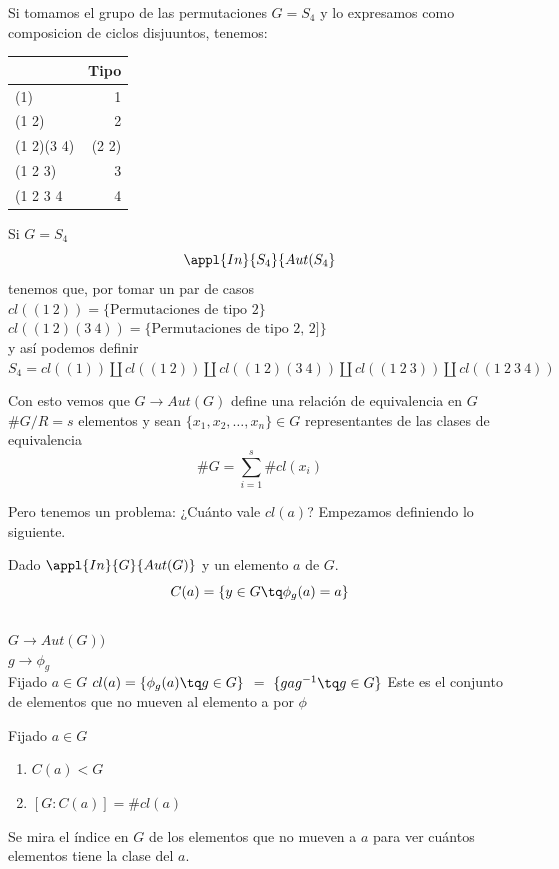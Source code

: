\documentclass{apuntes}
\begin{document}
\begin{example}
Si tomamos el grupo de las permutaciones $G=S_4$ y lo expresamos como composicion de ciclos disjuuntos, tenemos:\\
\begin{center}
\begin{tabular}{|l|r|}
\hline
& Tipo\\ 
\hline
(1) & 1\\
(1 2) & 2\\
(1 2)(3 4) & (2 2)\\
(1 2 3) & 3\\
(1 2 3 4 & 4\\
\hline
\end{tabular}
\end{center}
Si $G=S_4$\\
$$\appl{In}{S_4}{Aut(S_4}$$
tenemos que, por tomar un par de casos
$cl((1\ 2)) = \{ \text{Permutaciones de tipo 2} \}$\\
$cl((1\ 2)(3\ 4)) = \{ \text{Permutaciones de tipo 2, 2]} \}$\\
y así podemos definir\\
$S_4 = cl((1)) \coprod cl((1\ 2)) \coprod cl((1\ 2)(3\ 4)) \coprod cl((1\ 2\ 3)) \coprod cl((1\ 2\ 3\ 4))$
\end{example}

Con esto vemos que $G\longrightarrow Aut(G)$ define una relación de equivalencia en $G$\\
$\# G/R = s$ elementos y sean $\{ x_1, x_2, \hdots, x_n\} \in G$ representantes de las clases de equivalencia\\
$$\# G = \sum_{i=1}^s \# cl(x_i)$$

Pero tenemos un problema: ¿Cuánto vale $cl(a)$?
Empezamos definiendo lo siguiente.

\begin{defn}
Dado $\appl{In}{G}{Aut(G)}$ y un elemento $a$ de $G$.\\
$$C(a) = \{ y\in G \tq \phi _g(a) = a\} $$\\
$G\longrightarrow Aut(G))$\\
$g\longrightarrow \phi _g$\\
Fijado $a\in G$ $cl(a) = \{ \phi _g(a) \tq g\in G\} $ $=$ $\{ gag^{-1} \tq g\in G \} $
Este es el conjunto de elementos que no mueven al elemento a por $\phi$
\end{defn}

\begin{theorem}
Fijado $a\in G$\\
\begin{enumerate}
\item $C(a) < G$
\item $[ G:C(a) ] = \# cl(a) $
\end{enumerate}
Se mira el índice en $G$ de los elementos que no mueven a $a$ para ver cuántos elementos tiene la clase del $a$.
\end{theorem}
\end{document}
